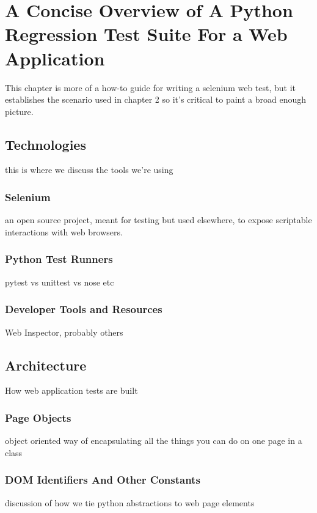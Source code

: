 \chapter{A Concise Overview of A Python Regression Test Suite For a Web Application}
This chapter is more of a how-to guide for writing a selenium web test, but it establishes the scenario used in chapter 2 so it's critical to paint a broad enough picture.

\section{Technologies}
this is where we discuss the tools we're using

\subsection{Selenium}
an open source project, meant for testing but used elsewhere, to expose scriptable interactions with web browsers. \citep{holmes2006automating, bruns2009web, razak2011agile, wang2009build, kaur2013comparative, kongsli2007security, artzi2011framework}

\subsection{Python Test Runners}
pytest vs unittest vs nose etc \citep{nielsen2014python, pajankar2017python}
\subsection{Developer Tools and Resources}
Web Inspector, probably others\citep{odell2014browser}

\section{Architecture}
How web application tests are built

\subsection{Page Objects}
object oriented way of encapsulating all the things you can do on one page in a class \citep{liu2000object, kung2000object, leotta2013improving, marchetto2008state}

\subsection{DOM Identifiers And Other Constants}
discussion of how we tie python abstractions to web page elements \citep{gupta2003dom,DOMStand78, nicholus2016understanding}

